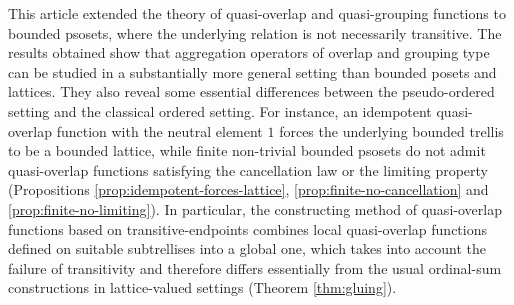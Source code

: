 \documentclass[preprint,12pt]{elsarticle}
\begin{document}
This article extended the theory of quasi-overlap and quasi-grouping functions to bounded psosets, where the underlying relation is not necessarily transitive. The results obtained show that aggregation operators of overlap and grouping type can be studied in a substantially more general setting than bounded posets and lattices. They also reveal some essential differences between the pseudo-ordered setting and the classical ordered setting. For instance, an idempotent quasi-overlap function with the neutral element $1$ forces the underlying bounded trellis to be a bounded lattice, while finite non-trivial bounded psosets do not admit quasi-overlap functions satisfying the cancellation law or the limiting property (Propositions \ref{prop:idempotent-forces-lattice}, \ref{prop:finite-no-cancellation} and \ref{prop:finite-no-limiting}). In particular, the constructing method of quasi-overlap functions based on transitive-endpoints combines local quasi-overlap functions defined on suitable subtrellises into a global one, which takes into account the failure of transitivity and therefore differs essentially from the usual ordinal-sum constructions in lattice-valued settings (Theorem \ref{thm:gluing}).
\end{document}
